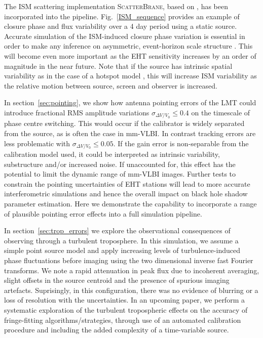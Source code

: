 The ISM scattering implementation \textsc{ScatterBrane}, based on \citet*{Johnson_2015a}, has been incorporated into the pipeline. Fig.~\ref{ISM_sequence} provides an example of closure phase and flux variability over a 4 day period using a static source. Accurate simulation of the ISM-induced closure phase variation is essential in order to make any inference on asymmetric, event-horizon scale structure \citep[e.g.][]{Fish_2016,2016arXiv160106571O}. This will become even more important as the EHT sensitivity increases by an order of magnitude in the near future. Note that if the source has intrinsic spatial variability as in the case of a hotspot model \cite{Doeleman_2009}, this will increase ISM variability as the relative motion between source, screen and observer is increased. 


In section~\ref{sec:pointing}, we show how antenna pointing errors of the LMT could introduce fractional RMS amplitude variations $\sigma_{\Delta V/V_0} \le 0.4$ on the timescale of phase centre switching. This would occur if the calibrator is widely separated from the source, as is often the case in mm-VLBI. In contrast tracking errors are less problematic with $\sigma_{\Delta V/V_0} \le 0.05$. If the gain error is non-separable from the calibration model used, it could be interpreted as intrinsic variability, substructure and/or increased noise. If unaccounted for, this effect has the potential to limit the dynamic range of mm-VLBI images. Further tests to constrain the pointing uncertainties of EHT stations will lead to more accurate interferometric simulations and hence the overall impact on black hole shadow parameter estimation. Here we demonstrate the capability to incorporate a range of plausible pointing error effects into a full simulation pipeline.  


In section~\ref{sec:trop_errors} we explore the observational consequences of observing through a turbulent troposphere. In this simulation, we assume a simple point source model and apply increasing levels of turbulence-induced phase fluctuations before imaging using the two dimensional inverse fast Fourier transforms. We note a rapid attenuation in peak flux due to incoherent averaging, slight offsets in the source centroid and the presence of spurious imaging artefacts. Suprisingly, in this configuration, there was no evidence of blurring or a loss of resolution with the uncertainties. In an upcoming paper, we perform a systematic exploration of the turbulent tropospheric effects on the accuracy of fringe-fitting algorithms/strategies, through use of an automated calibration procedure and including the added complexity of a time-variable source. 

